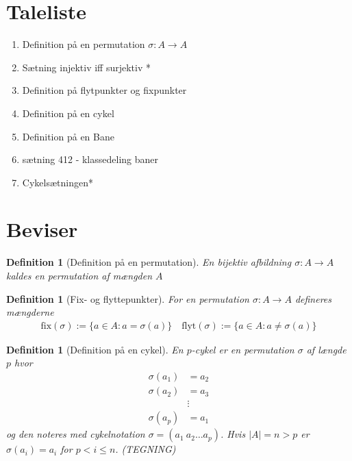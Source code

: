 \documentclass[10pt,twoside,openany,final]{memoir}
\theoremstyle{break}
\newtheorem{definition}[section]{Definition}
\theoremstyle{Break}
\begin{document}
\section*{Taleliste}
\begin{enumerate}
\item Definition på en permutation $\sigma \colon A \to A$
\item Sætning injektiv iff surjektiv *
\item Definition på flytpunkter og fixpunkter
\item Definition på en cykel
\item Definition på en Bane
\item sætning 412 - klassedeling baner
\item Cykelsætningen*
\end{enumerate}

\section*{Beviser}
\begin{definition}[Definition på en permutation]
En bijektiv afbildning $\sigma \colon A \to A$ kaldes en permutation af mængden $A$
\end{definition}

\begin{definition}[Fix- og flyttepunkter]
For en permutation $\sigma \colon A \to A$ defineres mængderne 
\begin{align*}
\text{fix}(\sigma):=\{ a \in A \colon a = \sigma(a)\} \quad \text{flyt}(\sigma):=\{a \in A \colon a \neq \sigma(a)\}
\end{align*}
\end{definition}

\begin{definition}[Definition på en cykel]
En $p$-cykel er en permutation $\sigma$ af længde $p$ hvor 
\begin{align*}
\sigma(a_{1})&=a_{2}\\
\sigma(a_{2})&=a_{3}\\
&\vdots\\
\sigma(a_{p})&=a_{1}
\end{align*}
og den noteres med cykelnotation $\sigma=(a_{1} \ a_{2} \dots a_{p})$. Hvis $|A|=n > p$ er $\sigma(a_{i})=a_{i}$ for $p < i \leq n$. (TEGNING) 
\end{definition}
\end{document}

